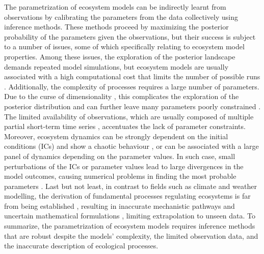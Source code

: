 The parametrization of ecosystem models can be indirectly learnt from observations by calibrating the parameters from the data collectively using inference methods. These methods proceed by maximizing the posterior probability of the parameters given the observations, but their success is subject to a number of issues, some of which specifically relating to ecosystem model properties.
%
Among these issues, the exploration of the posterior landscape demands repeated model simulations, but ecosystem models are usually associated with a high computational cost that limits the number of possible runs \cite{Fisher2018}. 
%
Additionally, the complexity of processes requires a large number of parameters. Due to the curse of dimensionality \cite{Boyd2012}, this complicates the exploration of the posterior distribution and can further leave many parameters poorly constrained \cite{Gutenkunst2007}. The limited availability of observations, which are usually composed of multiple partial short-term time series \cite{Scheiter2013,Schartau2017}, accentuates the lack of parameter constraints. 
%
Moreover, ecosystem dynamics can be strongly dependent on the initial conditions (ICs) and show a chaotic behaviour \cite{Hastings1993,Huisman1999,Beninca2008}, or can be associated with a large panel of dynamics depending on the parameter values. In such case, small perturbations of the ICs or parameter values lead to large divergences in the model outcomes, causing numerical problems in finding the most probable parameters \cite{DeAngelis2015}.
%
Last but not least, in contrast to fields such as climate and weather modelling, the derivation of fundamental processes regulating ecosystems is far from being established \cite{Gehlen2015,Schartau2017,Purves2013}, resulting in inaccurate mechanistic pathways and uncertain mathematical formulations \cite{Gentleman2003}, limiting extrapolation to unseen data.
%
To summarize, the parametrization of ecosystem models requires inference methods that are robust despite the models' complexity, the limited observation data, and the inaccurate description of ecological processes.

